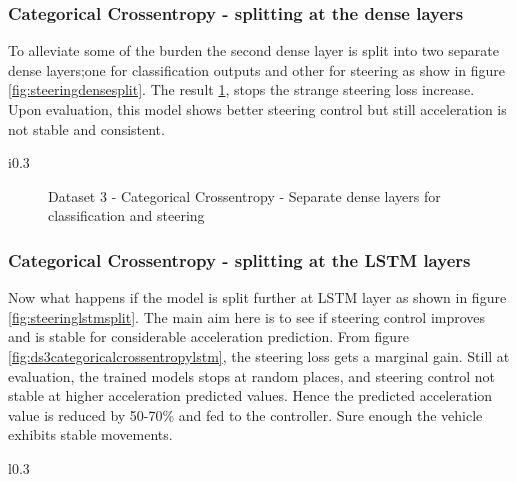 \subsubsection*{Categorical Crossentropy - splitting at the dense layers}
To alleviate some of the burden the second dense layer is split into two separate dense
layers;one for classification outputs and other for steering as show in figure
\ref{fig:steeringdensesplit}. The result \ref{fig:ds3categoricalcrossentropydense}, stops
the strange steering loss increase. Upon evaluation, this model shows better steering
control but still acceleration is not stable and consistent.
\begin{wrapfigure}{i}{0.3\textwidth}
	\centering
    \def\svgwidth{0.3\textwidth}
    \caption{Split at the second dense layer}
    \label{fig:steeringdensesplit}
\end{wrapfigure}

\begin{figure}[h]
	\centering
    \def\svgwidth{0.8\textwidth}
    \caption{Dataset 3 - Categorical Crossentropy - Separate dense layers for
    classification and steering}
    \label{fig:ds3categoricalcrossentropydense}
\end{figure}


\subsubsection*{Categorical Crossentropy - splitting at the LSTM layers}
Now what happens if the model is split further at LSTM layer as shown in figure
\ref{fig:steeringlstmsplit}. The main aim here is to see if steering control improves and
is stable for considerable acceleration prediction. From figure
\ref{fig:ds3categoricalcrossentropylstm}, the steering loss gets a marginal gain. Still at
evaluation, the trained models stops at random places, and steering control not stable at
higher acceleration predicted values. Hence the predicted acceleration value is reduced by
50-70\% and fed to the controller. Sure enough the vehicle exhibits stable movements.

\begin{wrapfigure}{l}{0.3\textwidth}
	\centering
    \def\svgwidth{0.3\textwidth}
    \caption{Split at the LSTM layer}
    \label{fig:steeringlstmsplit}
\end{wrapfigure}

